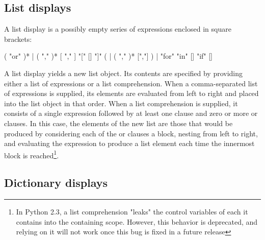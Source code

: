 \subsection{List displays\label{lists}}

A list display is a possibly empty series of expressions enclosed in
square brackets:

\begin{productionlist}
             { ( "or"  )*
              | }
             { ( ","  )* [ "," ]}
             {"[" [] "]"}
             { ( 
              | ( ","  )* [","] )}
             { | }
             {"for"  "in" 
              []}
             {"if"  []}
\end{productionlist}

A list display yields a new list object.  Its contents are specified
by providing either a list of expressions or a list comprehension.
When a comma-separated list of expressions is supplied, its elements are
evaluated from left to right and placed into the list object in that
order.  When a list comprehension is supplied, it consists of a
single expression followed by at least one  clause and zero or
more  or  clauses.  In this
case, the elements of the new list are those that would be produced
by considering each of the  or  clauses a block,
nesting from
left to right, and evaluating the expression to produce a list element
each time the innermost block is reached\footnote{In Python 2.3, a
list comprehension "leaks" the control variables of each
 it contains into the containing scope.  However, this
behavior is deprecated, and relying on it will not work once this
bug is fixed in a future release}.


\subsection{Dictionary displays\label{dict}}

